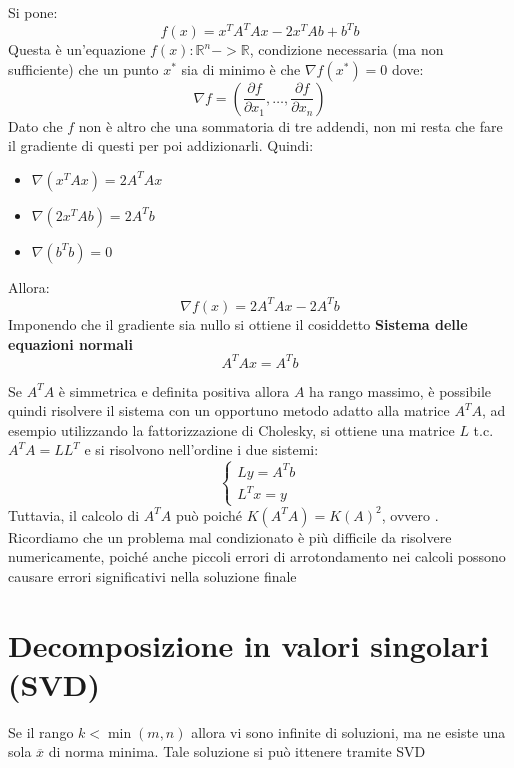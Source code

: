 Si pone:
\[
    f(x) = x^T A^T Ax - 2x^T Ab + b^T b
\]
Questa è un'equazione $f(x): \mathbb{R}^n -> \mathbb{R}$, condizione necessaria (ma non sufficiente) che un punto $x^*$ sia di minimo è che $\nabla f(x^*) = 0$ dove:
\[
    \nabla f = (\frac{\partial f}{\partial x_1}, \dots, \frac{\partial f}{\partial x_n}
    )
\]
Dato che $f$ non è altro che una sommatoria di tre addendi, non mi resta che fare il gradiente di questi per poi addizionarli. Quindi:
\begin{itemize}
    \item $\nabla(x^TAx)=2A^TAx$
    \item $\nabla(2x^T Ab)=2A^Tb$
    \item $\nabla( b^T b)=0$
\end{itemize}
Allora:
\[
    \nabla f(x)=2A^TAx-2A^Tb
\]
Imponendo che il gradiente sia nullo si ottiene il cosiddetto \textbf{Sistema delle equazioni normali}
\[
    A^T Ax = A^T b    
\]

Se $ A^T A$ è simmetrica e definita positiva allora $A$ ha rango massimo, è possibile quindi risolvere il sistema con un opportuno metodo adatto alla matrice $A^T A$, ad esempio utilizzando la fattorizzazione di Cholesky, si ottiene una matrice $L$ t.c. $A^T A = LL^T$ e si risolvono nell’ordine i due sistemi:
\[
    \begin{cases}
        Ly = A^T b \\
        L^Tx = y  
    \end{cases}
\]
Tuttavia, il calcolo di $A^TA$ può  poiché $K(A^TA) = K(A)^2$, ovvero . Ricordiamo che un problema mal condizionato è più difficile da risolvere numericamente, poiché anche piccoli errori di arrotondamento nei calcoli possono causare errori significativi nella soluzione finale

\section{Decomposizione in valori singolari (SVD)}
Se il rango $k<\min(m,n)$ allora vi sono infinite di soluzioni, ma ne esiste una sola $\overline{x}$ di norma minima. Tale soluzione si può ittenere tramite SVD


